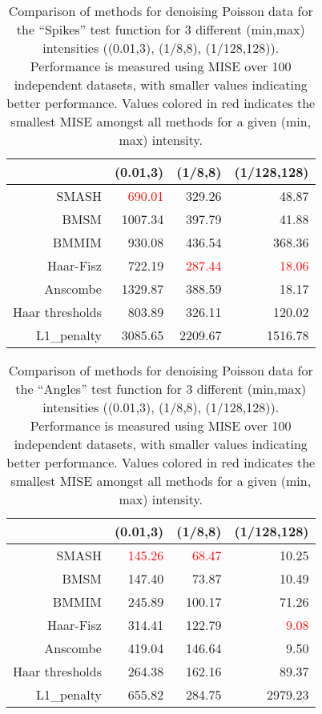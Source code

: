 \documentclass[12pt]{article}
\begin{document}
\begin{table}[ht]
\centering
\begin{tabular}{rrrr}
  \hline
 & (0.01,3) & (1/8,8) & (1/128,128) \\ 
  \hline
SMASH & \textcolor{red}{690.01} & 329.26 & 48.87 \\ 
  BMSM & 1007.34 & 397.79 & 41.88 \\ 
  BMMIM & 930.08 & 436.54 & 368.36 \\ 
  Haar-Fisz & 722.19 & \textcolor{red}{287.44} & \textcolor{red}{18.06} \\ 
  Anscombe & 1329.87 & 388.59 & 18.17 \\ 
  Haar thresholds & 803.89 & 326.11 & 120.02 \\ 
  L1\_penalty & 3085.65 & 2209.67 & 1516.78 \\ 
   \hline
\end{tabular}
\caption{Comparison of methods for denoising Poisson data for the ``Spikes'' test function for 3 different (min,max) intensities ((0.01,3), (1/8,8), (1/128,128)). Performance is measured using MISE over 100 independent datasets, with smaller values indicating better performance. Values colored in red indicates the smallest MISE amongst all methods for a given (min, max) intensity.} 
\label{table:pois_sp}
\end{table}


\begin{table}[ht]
\centering
\begin{tabular}{rrrr}
  \hline
 & (0.01,3) & (1/8,8) & (1/128,128) \\ 
  \hline
SMASH & \textcolor{red}{145.26} & \textcolor{red}{68.47} & 10.25 \\ 
  BMSM & 147.40 & 73.87 & 10.49 \\ 
  BMMIM & 245.89 & 100.17 & 71.26 \\ 
  Haar-Fisz & 314.41 & 122.79 & \textcolor{red}{9.08} \\ 
  Anscombe & 419.04 & 146.64 & 9.50 \\ 
  Haar thresholds & 264.38 & 162.16 & 89.37 \\ 
  L1\_penalty & 655.82 & 284.75 & 2979.23 \\ 
   \hline
\end{tabular}
\caption{Comparison of methods for denoising Poisson data for the ``Angles'' test function for 3 different (min,max) intensities ((0.01,3), (1/8,8), (1/128,128)). Performance is measured using MISE over 100 independent datasets, with smaller values indicating better performance. Values colored in red indicates the smallest MISE amongst all methods for a given (min, max) intensity.} 
\label{table:pois_ang}
\end{table}
\end{document}
